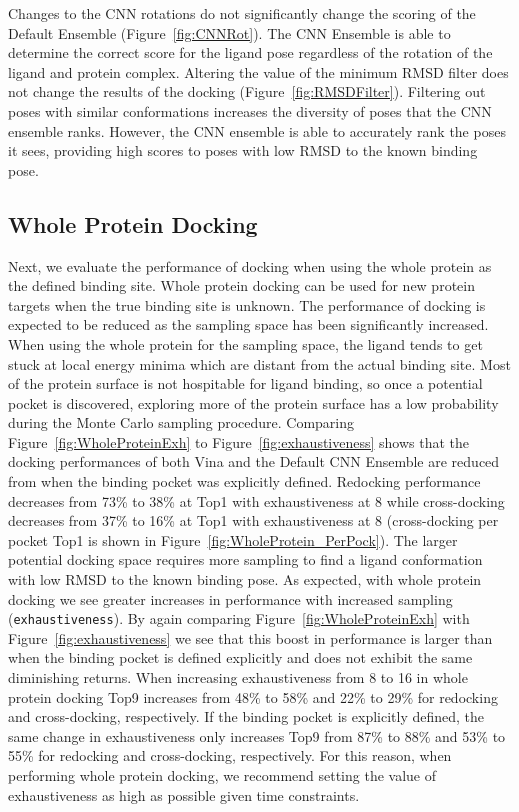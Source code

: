 \documentclass[linenumbers,doublespacing]{bmcart}
\begin{document}
Changes to the CNN rotations do not significantly change the scoring of the Default Ensemble (Figure~\ref{fig:CNNRot}). The CNN Ensemble is able to determine the correct score for the ligand pose regardless of the rotation of the ligand and protein complex. Altering the value of the minimum RMSD filter does not change the results of the docking (Figure~\ref{fig:RMSDFilter}).  Filtering out poses with similar conformations increases the diversity of poses that the CNN ensemble ranks. However, the CNN ensemble is able to accurately rank the poses it sees, providing high scores to poses with low RMSD to the known binding pose.

\subsection{Whole Protein Docking}

Next, we evaluate the performance of docking when using the whole protein as the defined binding site. Whole protein docking can be used for new protein targets when the true binding site is unknown. The performance of docking is expected to be reduced as the sampling space has been significantly increased. When using the whole protein for the sampling space, the ligand  tends to get stuck at local energy minima which are distant from the actual binding site. Most of the protein surface is not hospitable for ligand binding, so once a potential pocket is discovered, exploring more of the protein surface has a low probability during the Monte Carlo sampling procedure. Comparing Figure~\ref{fig:WholeProteinExh} to Figure~\ref{fig:exhaustiveness} shows that the docking performances of both Vina and the Default CNN Ensemble are reduced from when the binding pocket was explicitly defined. Redocking performance decreases from 73\% to 38\% at Top1 with exhaustiveness at 8 while cross-docking decreases from 37\% to 16\% at Top1 with exhaustiveness at 8 (cross-docking per pocket Top1 is shown in Figure~\ref{fig:WholeProtein_PerPock}). The larger potential docking space requires more sampling to find a ligand conformation with low RMSD to the known binding pose. As expected, with whole protein docking we see greater increases in performance with increased sampling (\texttt{exhaustiveness}). By again comparing Figure~\ref{fig:WholeProteinExh} with Figure~\ref{fig:exhaustiveness} we see that this boost in performance is larger than when the binding pocket is defined explicitly and does not exhibit the same diminishing returns. When increasing exhaustiveness from 8 to 16 in whole protein docking Top9 increases from 48\% to 58\% and 22\% to 29\% for redocking and cross-docking, respectively. If the binding pocket is explicitly defined, the same change in exhaustiveness only increases Top9 from 87\% to 88\% and 53\% to 55\% for redocking and cross-docking, respectively. For this reason, when performing whole protein docking, we recommend setting the value of exhaustiveness as high as possible given time constraints.
\end{document}

